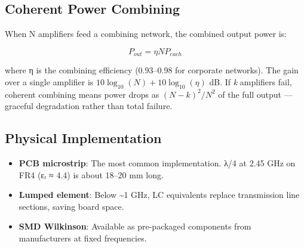       

\subsection{Coherent Power Combining}

      

When N amplifiers feed a combining network, the combined output power is:

      
\[P_{out} = \eta N P_{each}\]

      

where η is the combining efficiency (0.93–0.98 for corporate networks). The gain over a single amplifier is $10\log_{10}(N) + 10\log_{10}(\eta)$ dB. If \emph{k} amplifiers fail, coherent combining means power drops as $(N-k)^2/N^2$ of the full output — graceful degradation rather than total failure.

      

\subsection{Physical Implementation}

      
\begin{itemize}

        \item \textbf{PCB microstrip}: The most common implementation. λ/4 at 2.45 GHz on FR4 (εᵣ ≈ 4.4) is about 18–20 mm long.

        \item \textbf{Lumped element}: Below \textasciitilde{}1 GHz, LC equivalents replace transmission line sections, saving board space.

        \item \textbf{SMD Wilkinson}: Available as pre-packaged components from manufacturers at fixed frequencies.

      
\end{itemize}



